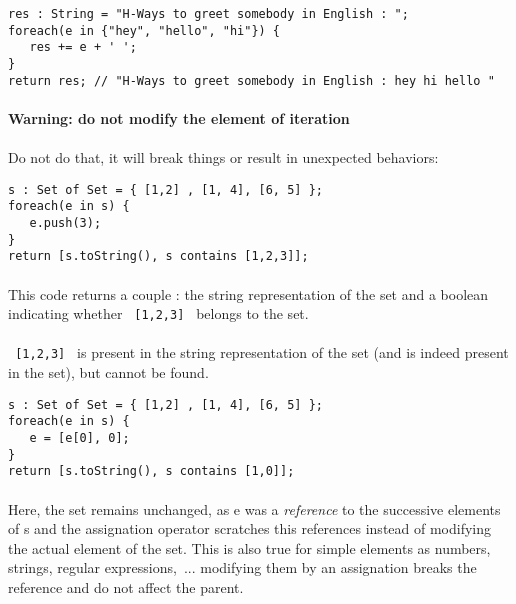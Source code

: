 \documentclass{article}
\let\subsubsubsection\paragraph
\begin{document}
\begin{sloppypar}
         
{\begin{lstlisting}
res : String = "H-Ways to greet somebody in English : ";
foreach(e in {"hey", "hello", "hi"}) {
   res += e + ' ';
}
return res; // "H-Ways to greet somebody in English : hey hi hello "
\end{lstlisting}
}


         

\subsubsubsection{ Warning: do not modify the element of iteration\\}
\paragraph{}
Do not do that, it will break things or result in unexpected behaviors:
{\begin{lstlisting}
s : Set of Set = { [1,2] , [1, 4], [6, 5] };
foreach(e in s) {
   e.push(3);
}
return [s.toString(), s contains [1,2,3]];
\end{lstlisting}
}


            
\paragraph{}
This code returns a couple : the string representation of the set and a boolean indicating whether \lstinline! [1,2,3] ! belongs to the set.
            
            
\paragraph{}
\lstinline! [1,2,3] ! is present in the string representation of the set (and is indeed present in the set), but cannot be found.

{\begin{lstlisting}
s : Set of Set = { [1,2] , [1, 4], [6, 5] };
foreach(e in s) {
   e = [e[0], 0];
}
return [s.toString(), s contains [1,0]];
\end{lstlisting}
}


            
\paragraph{}
Here, the set remains unchanged, as e was a {\itshape reference} to the successive elements of s and the assignation operator scratches this references instead of modifying the actual element of the set. This is also true for simple elements as numbers, strings, regular expressions, ... modifying them by an assignation breaks the reference and do not affect the parent.


\end{sloppypar}
\end{document}

